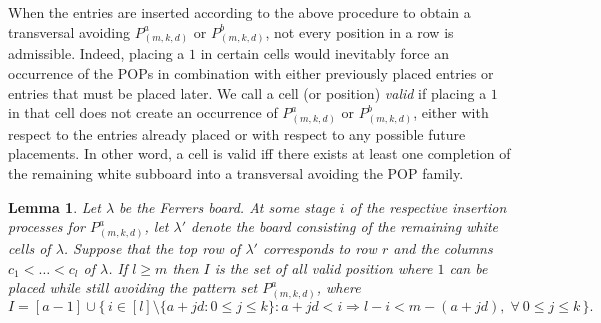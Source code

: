 \documentclass[12pt, english, a4paper]{article}
\theoremstyle{plain}
\newtheorem{lemma}[theorem]{Lemma}
\theoremstyle{definition}
\theoremstyle{remark}
\begin{document}
 When the entries are inserted according to the above procedure to obtain a transversal avoiding \(P^a_{(m,k,d)}\) or \(P^b_{(m,k,d)}\), not every position in a row is admissible. Indeed, placing a \(1\) in certain cells would inevitably force an occurrence of the POPs in combination with either previously placed entries or entries that must be placed later.
We call a cell (or position) \emph{valid} if placing a \(1\) in that cell does not create an occurrence of \(P^a_{(m,k,d)}\) or \(P^b_{(m,k,d)}\), either with respect to the entries already placed or with respect to any possible future placements. In other word, a cell is valid iff there exists at least one completion of the remaining white subboard into a transversal avoiding the POP family.

\begin{lemma}
    Let $\lambda$ be the Ferrers board. At some stage $i$ of the respective insertion processes for $P^a_{(m,k,d)}$, let $\lambda'$ denote the board consisting of the remaining white cells of $\lambda$. Suppose that the top row of $\lambda'$ corresponds to row $r$ and the columns $c_1<\dots<c_l$ of $\lambda$.
    If $l\geq m$ then $I$ is the set of all valid position where $1$ can be placed while still avoiding the pattern set $P^a_{(m,k,d)}$, where
$$ I=[a-1]\cup 
\{\, i\in[l]\setminus\{a+jd:0\le j\le k\} :
a+jd<i \Rightarrow l-i<m-(a+jd),\;\forall ~0\le j\le k \,\}.
$$
\end{lemma}


\end{document}
